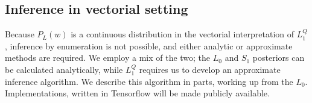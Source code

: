 \documentclass[9pt,twocolumn,twoside,lineno]{pnas-new}
\newcommand{\Listener}{L}
\newcommand{\QLONE}{\Listener_{{1}}^{{Q}}}
\begin{document}
{%

\subsection*{Inference in vectorial setting} \label{technicaloverview}


	Because $P_L(w)$ is a continuous distribution in the vectorial interpretation of $\QLONE$, inference by enumeration is not possible, and either analytic or approximate methods are required. We employ a mix of the two; the $L_0$ and $S_1$ posteriors can be calculated analytically, while $\QLONE$ requires us to develop an approximate inference algorithm.
	We describe this algorithm in parts, working up from the $L_0$. Implementations, written in Tensorflow will be made publicly available.



}
\end{document}
